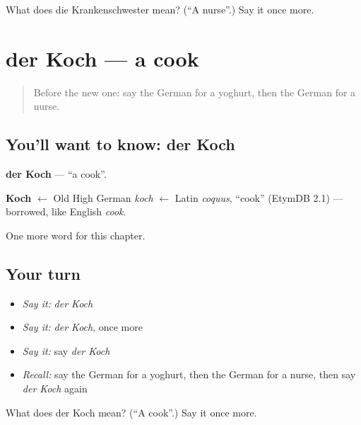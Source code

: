 \begin{tcolorbox}[breakable,colback=teal!4,colframe=teal!35!black,title={Before you move on}]
What does die Krankenschwester mean? (\textquotedblleft{}A nurse\textquotedblright{}.) Say it once more.
\end{tcolorbox}
\section[der Koch]{der Koch — a cook}

\label{lesson:GE-C124-koch}



\begin{quote}
Before the new one: say the German for a yoghurt, then the German for a nurse.
\end{quote}

\subsection*{You'll want to know: der Koch}
\textbf{der Koch} — \textquotedblleft{}a cook\textquotedblright{}.

\begin{cousinweb}
\textbf{Koch} $\leftarrow$ Old High German \emph{koch} $\leftarrow$ Latin \emph{coquus}, \textquotedblleft{}cook\textquotedblright{} (EtymDB 2.1) — borrowed, like English \emph{cook}.
\end{cousinweb}

\begin{grammarlens}[title={What you've built}]
One more word for this chapter.
\end{grammarlens}

\subsection*{Your turn}
\begin{itemize}
\raggedright
  \item \emph{Say it:} \emph{der Koch}
  \item \emph{Say it:} \emph{der Koch}, once more
  \item \emph{Say it:} say \emph{der Koch}
  \item \emph{Recall:} say the German for a yoghurt, then the German for a nurse, then say \emph{der Koch} again
\end{itemize}

\begin{tcolorbox}[breakable,colback=teal!4,colframe=teal!35!black,title={Before you move on}]
What does der Koch mean? (\textquotedblleft{}A cook\textquotedblright{}.) Say it once more.
\end{tcolorbox}
